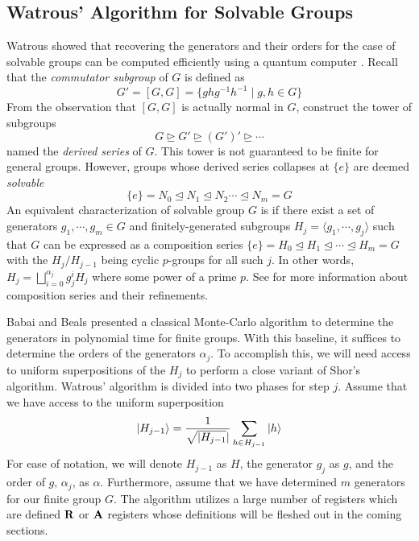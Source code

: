 \subsection{Watrous' Algorithm for Solvable Groups}
Watrous showed that recovering the generators and their orders for the case of solvable groups can be computed efficiently using a quantum computer \cite{watrous2001quantum}. Recall that the \emph{commutator subgroup} of $G$ is defined as
\[ G' = [G,G] = \{ghg^{-1}h^{-1} \mid g,h \in G \} \]
%
From the observation that $[G,G]$ is actually normal in $G$, construct the tower of subgroups
\[ G \trianglerighteq G' \trianglerighteq  (G')' \trianglerighteq  \cdots \]
named the \emph{derived series} of $G$. This tower is not guaranteed to be finite for general groups. However, groups whose derived series collapses at $\{e\}$ are deemed \emph{solvable}
%
\[ \{e\} = N_0 \trianglelefteq N_1 \trianglelefteq N_2 \cdots \trianglelefteq N_m = G \]
%
An equivalent characterization of solvable group $G$ is if there exist a set of generators $g_1,\cdots, g_m \in G$ and finitely-generated subgroups $H_j = \langle g_1,\cdots, g_j \rangle$ such that $G$ can be expressed as a composition series $\{e\} = H_0 \trianglelefteq H_1 \trianglelefteq \cdots \trianglelefteq H_m = G$ with the $H_j / H_{j-1}$ being cyclic $p$-groups for all such $j$. In other words, $H_j = \bigsqcup_{i = 0}^{\alpha_j} g_j^{i} H_j$ where some power of a prime $p$. See \cite{aluffi2009algebra} for more information about composition series and their refinements.

Babai and Beals presented a classical Monte-Carlo algorithm to determine the generators in polynomial time \cite{babai1995fast} for finite groups. With this baseline, it suffices to determine the orders of the generators $\alpha_j$. To accomplish this, we will need access to uniform superpositions of the $H_j$ to perform a close variant of Shor's algorithm. Watrous' algorithm is divided into two phases for step $j$. Assume that we have access to the uniform superposition
%
\[\ket{H_{j-1}} = \frac{1}{\sqrt{|H_{j-1}}|} \sum_{h \in H_{j-1}} \ket{h} \]
%
For ease of notation, we will denote $H_{j-1}$ as $H$, the generator $g_{j}$ as $g$, and the order of $g$, $\alpha_j$, as $\alpha$. Furthermore, assume that we have determined $m$ generators for our finite group $G$. The algorithm utilizes a large number of registers which are defined ${\bf R}$ or ${\bf A}$ registers whose definitions will be fleshed out in the coming sections.

